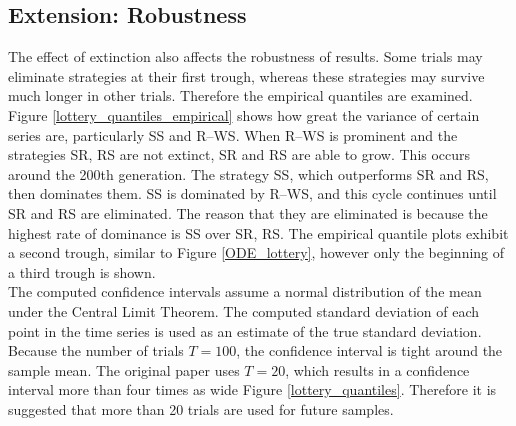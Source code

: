 \subsection{Extension: Robustness} 
The effect of extinction also affects the robustness of results. Some trials may eliminate strategies at their first trough, whereas these strategies may survive much longer in other trials. Therefore the empirical quantiles are examined.\\
\FloatBarrier
{}
\FloatBarrier
Figure \ref{lottery_quantiles_empirical} shows how great the variance of certain series are, particularly SS and R--WS. When R--WS is prominent and the strategies SR, RS are not extinct, SR and RS are able to grow. This occurs around the 200th generation. The strategy SS, which outperforms SR and RS, then dominates them. SS is dominated by R--WS, and this cycle continues until SR and RS are eliminated. The reason that they are eliminated is because the highest rate of dominance is SS over SR, RS. The empirical quantile plots exhibit a second trough, similar to Figure \ref{ODE_lottery}, however only the beginning of a third trough is shown.  \\
\FloatBarrier
{}
\FloatBarrier
 The computed confidence intervals assume a normal distribution of the mean under the Central Limit Theorem. The computed standard deviation of each point in the time series is used as an estimate of the true standard deviation. Because the number of trials $T=100$, the confidence interval is tight around the sample mean. The original paper uses $T=20$, which results in a confidence interval more than four times as wide Figure \ref{lottery_quantiles}. Therefore it is suggested that more than 20 trials are used for future samples. \\



